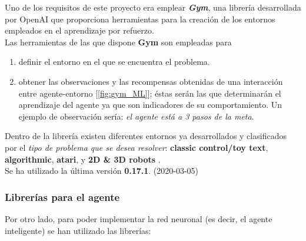 Uno de los requisitos de este proyecto era emplear \textbf{\textit{Gym}}, una librería desarrollada por OpenAI que proporciona herramientas para la creación de los entornos empleados en el aprendizaje por refuerzo. \\

Las herramientas de las que dispone \textbf{Gym} son empleadas para

\begin{enumerate}
    \item definir el entorno en el que se encuentra el problema.
    \item obtener las observaciones y las recompensas obtenidas de una interacción entre agente-entorno [\ref{fig:gym_ML}]; éstas serán las que determinarán el aprendizaje del agente ya que son indicadores de su comportamiento. Un ejemplo de observación sería: \textit{el agente está a 3 pasos de la meta}. 
\end{enumerate}

Dentro de la librería existen diferentes entornos ya desarrollados y clasificados por el \textit{tipo de problema que se desea resolver}:  \textbf{classic control/toy text}, \textbf{algorithmic}, \textbf{atari}, y  \textbf{2D \& 3D robots} \cite{gymDocumentation}.\\

Se ha utilizado la última versión \textbf{0.17.1}. (2020-03-05)

\subsubsection{Librerías para el agente}

Por otro lado, para poder implementar la red neuronal (es decir, el agente inteligente) se han utilizado las librerías:

